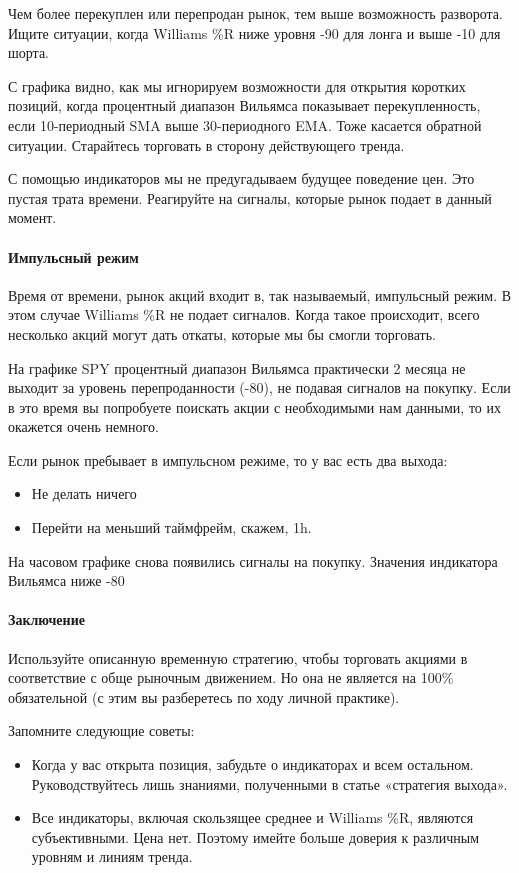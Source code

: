 \documentclass{book}
\begin{document}
Чем более перекуплен или перепродан рынок, тем выше возможность разворота. Ищите ситуации, когда Williams \%R ниже уровня -90 для лонга и выше -10 для шорта.

С графика видно, как мы игнорируем возможности для открытия коротких позиций, когда процентный диапазон Вильямса показывает перекупленность, если 10-периодный SMA выше 30-периодного EMA. Тоже касается обратной ситуации. Старайтесь торговать в сторону действующего тренда.

С помощью индикаторов мы не предугадываем будущее поведение цен. Это
пустая трата времени. Реагируйте на сигналы, которые рынок подает в
данный момент.

\paragraph{Импульсный режим}

Время от времени, рынок акций входит в, так называемый, импульсный режим. В этом случае Williams \%R не подает сигналов. Когда такое происходит, всего несколько акций могут дать откаты, которые мы бы смогли торговать.

На графике SPY процентный диапазон Вильямса практически 2 месяца не выходит за уровень перепроданности (-80), не подавая сигналов на покупку. Если в это время вы попробуете поискать акции с необходимыми нам данными, то их окажется очень немного.

Если рынок пребывает в импульсном режиме, то у вас есть два выхода:
\begin{itemize}
\item     Не делать ничего
\item     Перейти на меньший таймфрейм, скажем, 1h.
\end{itemize}

На часовом графике снова появились сигналы на покупку. Значения
индикатора Вильямса ниже -80

\paragraph{Заключение}

Используйте описанную временную стратегию, чтобы торговать акциями в соответствие с обще рыночным движением. Но она не является на 100\% обязательной (с этим вы разберетесь по ходу личной практике).

Запомните следующие советы:
\begin{itemize}
\item     Когда у вас открыта позиция, забудьте о индикаторах и всем остальном. Руководствуйтесь лишь знаниями, полученными в статье «стратегия выхода».
\item     Все индикаторы, включая скользящее среднее и Williams \%R, являются субъективными. Цена нет. Поэтому имейте больше доверия к различным уровням и линиям тренда.
\end{itemize}
\end{document}
